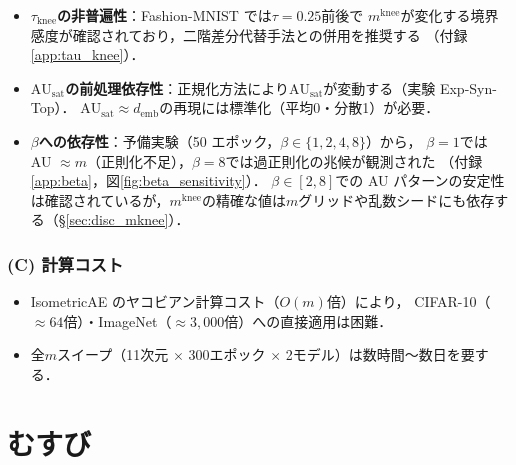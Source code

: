\documentclass[11pt,a4paper]{jsarticle}
\newcommand{\AUsat}{\mathrm{AU}_{\mathrm{sat}}}
\newcommand{\mknee}{m^{\mathrm{knee}}}
\newcommand{\demb}{d_{\mathrm{emb}}}
\begin{document}
\begin{itemize}
  \item \textbf{$\tau_{\mathrm{knee}}$の非普遍性}：Fashion-MNIST では$\tau = 0.25$前後で
        $\mknee$が変化する境界感度が確認されており，二階差分代替手法との併用を推奨する
        （付録\ref{app:tau_knee}）．
  \item \textbf{$\AUsat$の前処理依存性}：正規化方法により$\AUsat$が変動する（実験 Exp-Syn-Top）．
        $\AUsat \approx \demb$の再現には標準化（平均0・分散1）が必要．
  \item \textbf{$\beta$への依存性}：予備実験（50 エポック，$\beta \in \{1,2,4,8\}$）から，
        $\beta = 1$では AU $\approx m$（正則化不足），$\beta = 8$では過正則化の兆候が観測された
        （付録\ref{app:beta}，図\ref{fig:beta_sensitivity}）．
        $\beta \in [2, 8]$での AU パターンの安定性は確認されているが，$\mknee$の精確な値は$m$グリッドや乱数シードにも依存する（§\ref{sec:disc_mknee}）．
\end{itemize}

\subsubsection*{(C) 計算コスト}

\begin{itemize}
  \item IsometricAE のヤコビアン計算コスト（$O(m)$倍）により，
        CIFAR-10（$\approx 64$倍）・ImageNet（$\approx 3{,}000$倍）への直接適用は困難．
  \item 全$m$スイープ（11次元 $\times$ 300エポック $\times$ 2モデル）は数時間〜数日を要する．
\end{itemize}

\section{むすび}\label{sec:conclusion}
\end{document}
